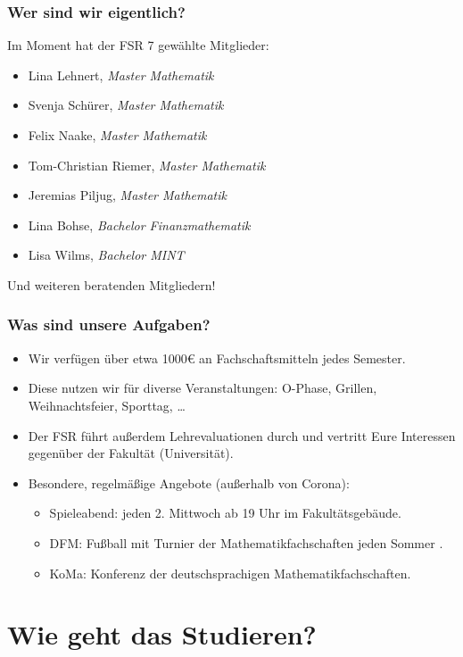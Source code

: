 \documentclass[10pt]{beamer}
\begin{document}
\begin{frame}
	\frametitle{Wer sind wir eigentlich?}

	Im Moment hat der FSR 7 gewählte Mitglieder:

	\begin{itemize}
		\item Lina Lehnert, \textit{Master Mathematik}
		\item Svenja Schürer, \textit{Master Mathematik}
		\item Felix Naake, \textit{Master Mathematik}
		\item Tom-Christian Riemer, \textit{Master Mathematik}
		\item Jeremias Piljug, \textit{Master Mathematik}
		\item Lina Bohse, \textit{Bachelor Finanzmathematik}
		\item Lisa Wilms, \textit{Bachelor MINT}
	\end{itemize}

	Und weiteren beratenden Mitgliedern!
\end{frame}

\begin{frame}
	\frametitle{Was sind unsere Aufgaben?}

	\begin{itemize}
		\item Wir verfügen über etwa 1000\euro{} an Fachschaftsmitteln jedes Semester.
		\item Diese nutzen wir für diverse Veranstaltungen: O-Phase, Grillen, Weihnachtsfeier, Sporttag, \ldots
		\item Der FSR führt außerdem Lehrevaluationen durch und vertritt Eure Interessen gegenüber der Fakultät (Universität).
		\item Besondere, regelmäßige Angebote (außerhalb von Corona):
			\begin{itemize}
				\item Spieleabend: jeden 2. Mittwoch ab 19 Uhr im Fakultätsgebäude.
				\item DFM: Fußball mit Turnier der Mathematikfachschaften jeden Sommer .
				\item KoMa: Konferenz der deutschsprachigen Mathematikfachschaften.
			\end{itemize}
	\end{itemize}
\end{frame}


\section{Wie geht das Studieren?}
\frame{\tableofcontents[currentsection]}
\end{document}
